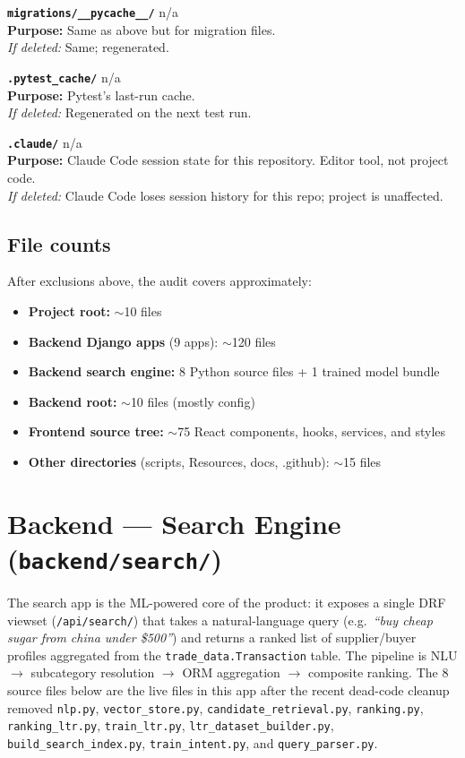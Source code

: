 \documentclass[10pt,a4paper]{article}
\newcommand{\fileEntry}[4]{%
  \par\noindent
  \begin{tcolorbox}[
    enhanced,
    breakable,
    colback=zarPaleGreen,
    colframe=zarMidGreen,
    arc=1pt,
    boxrule=0.4pt,
    left=6pt, right=6pt, top=3pt, bottom=3pt,
    fontupper=\small,
    before skip=2pt, after skip=4pt,
  ]
  \texttt{\textbf{#1}} \hfill {\small #2}\\[1pt]
  {\footnotesize\textbf{Purpose:} #3}\\[1pt]
  {\footnotesize\textit{If deleted:} #4}
  \end{tcolorbox}
}
\begin{document}
\fileEntry{migrations/\_\_pycache\_\_/}{n/a}{Same as above but for migration files.}{Same; regenerated.}

\fileEntry{.pytest\_cache/}{n/a}{Pytest's last-run cache.}{Regenerated on the next test run.}

\fileEntry{.claude/}{n/a}{Claude Code session state for this repository. Editor tool, not project code.}{Claude Code loses session history for this repo; project is unaffected.}

\subsection{File counts}

After exclusions above, the audit covers approximately:

\begin{itemize}[leftmargin=1.2cm]
  \item \textbf{Project root:} $\sim$10 files
  \item \textbf{Backend Django apps} (9 apps): $\sim$120 files
  \item \textbf{Backend search engine:} 8 Python source files + 1 trained model bundle
  \item \textbf{Backend root:} $\sim$10 files (mostly config)
  \item \textbf{Frontend source tree:} $\sim$75 React components, hooks, services, and styles
  \item \textbf{Other directories} (scripts, Resources, docs, .github): $\sim$15 files
\end{itemize}

\newpage

\section{Backend — Search Engine (\texttt{backend/search/})}

The search app is the ML-powered core of the product: it exposes a single
DRF viewset (\texttt{/api/search/}) that takes a natural-language query
(e.g.\ \textit{``buy cheap sugar from china under \$500''}) and returns a
ranked list of supplier/buyer profiles aggregated from the
\texttt{trade\_data.Transaction} table. The pipeline is NLU $\rightarrow$
subcategory resolution $\rightarrow$ ORM aggregation $\rightarrow$ composite
ranking. The 8 source files below are the live files in this app after the
recent dead-code cleanup removed \texttt{nlp.py}, \texttt{vector\_store.py},
\texttt{candidate\_retrieval.py}, \texttt{ranking.py}, \texttt{ranking\_ltr.py},
\texttt{train\_ltr.py}, \texttt{ltr\_dataset\_builder.py},
\texttt{build\_search\_index.py}, \texttt{train\_intent.py}, and
\texttt{query\_parser.py}.
\end{document}

